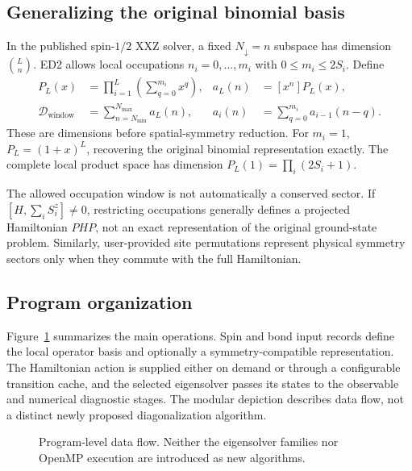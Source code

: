 \documentclass[preprint,12pt,nopreprintline]{elsarticle}
\newcommand{\updn}{N_{\downarrow}}
\begin{document}
\subsection{Generalizing the original binomial basis}
In the published spin-$1/2$ XXZ solver, a fixed
$\updn=n$ subspace has dimension $\binom{L}{n}$.
ED2 allows local occupations $n_i=0,\dots,m_i$
with $0\leq m_i\leq 2S_i$. Define
\begin{align}
P_L(x)&=\prod_{i=1}^{L}\left(\sum_{q=0}^{m_i}x^q\right),
&
a_L(n)&=[x^n]P_L(x),\nonumber\\
\mathcal D_{\mathrm{window}}
&=\sum_{n=N_{\min}}^{N_{\max}}a_L(n),
&
a_i(n)&=\sum_{q=0}^{m_i}a_{i-1}(n-q).
\label{eq:occupation}
\end{align}
These are dimensions before spatial-symmetry reduction.
For $m_i=1$, $P_L=(1+x)^L$, recovering the original
binomial representation exactly. The complete local product
space has dimension $P_L(1)=\prod_i(2S_i+1)$.

The allowed occupation window is not automatically a conserved
sector. If $[H,\sum_i S_i^z]\neq0$, restricting occupations
generally defines a projected Hamiltonian $PHP$, not an
exact representation of the original ground-state problem.
Similarly, user-provided site permutations represent physical
symmetry sectors only when they commute with the full Hamiltonian.


\subsection{Program organization}
Figure~\ref{fig:workflow} summarizes the main operations.
Spin and bond input records define the local operator basis
and optionally a symmetry-compatible representation.
The Hamiltonian action is supplied either on demand or
through a configurable transition cache, and the selected
eigensolver passes its states to the observable and numerical
diagnostic stages. The modular depiction describes data flow,
not a distinct newly proposed diagonalization algorithm.

\begin{figure}[t]
\centering
{}
\caption{Program-level data flow. Neither the eigensolver
families nor OpenMP execution are introduced as new algorithms.}
\label{fig:workflow}
\end{figure}
\end{document}
